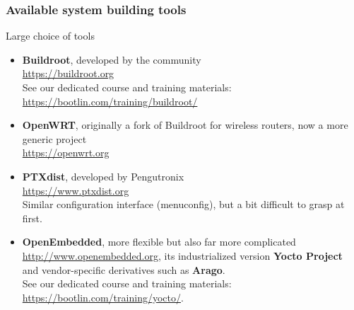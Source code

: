 \begin{frame}
  \frametitle{Available system building tools}
  Large choice of tools
  \small
  \begin{itemize}
  \item {\bf Buildroot}, developed by the community\\
    \url{https://buildroot.org}\\
    See our dedicated course and training materials:
    \url{https://bootlin.com/training/buildroot/}
  \item {\bf OpenWRT}, originally a fork of Buildroot for wireless routers,
    now a more generic project\\
    \url{https://openwrt.org}
  \item {\bf PTXdist}, developed by Pengutronix\\
    \url{https://www.ptxdist.org}\\
    Similar configuration interface (menuconfig), but a bit difficult
    to grasp at first.
  \item {\bf OpenEmbedded}, more flexible but also far more complicated\\
    \url{http://www.openembedded.org}, its industrialized version {\bf
      Yocto Project} and vendor-specific derivatives such as {\bf Arago}.\\
      See our dedicated course and training materials:
      \url{https://bootlin.com/training/yocto/}.
  \end{itemize}
\end{frame}

